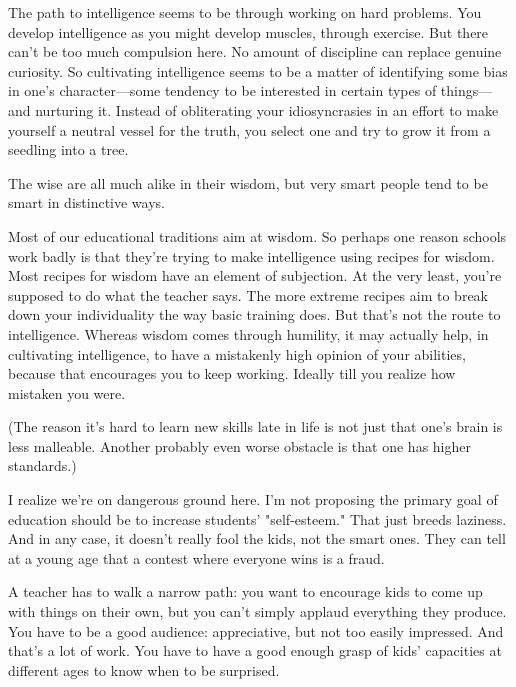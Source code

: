 The path to intelligence seems to
                  be through working on hard problems. You develop intelligence
                  as you might develop muscles, through exercise. But there
                  can't be too much compulsion here. No amount of discipline can
                  replace genuine curiosity. So cultivating intelligence seems
                  to be a matter of identifying some bias in one's
                  character---some tendency to be interested in certain
                  types of things---and nurturing it. Instead of
                  obliterating your idiosyncrasies in an effort to make yourself
                  a neutral vessel for the truth, you select one and try to grow
                  it from a seedling into a tree.

The wise are all
                  much alike in their wisdom, but very smart people tend to be
                  smart in distinctive ways.

Most of our educational
                  traditions aim at wisdom. So perhaps one reason schools work
                  badly is that they're trying to make intelligence using
                  recipes for wisdom. Most recipes for wisdom have an element of
                  subjection. At the very least, you're supposed to do what the
                  teacher says. The more extreme recipes aim to break down your
                  individuality the way basic training does. But that's not the
                  route to intelligence. Whereas wisdom comes through humility,
                  it may actually help, in cultivating intelligence, to have a
                  mistakenly high opinion of your abilities, because that
                  encourages you to keep working. Ideally till you realize how
                  mistaken you were.

(The reason it's hard to learn
                  new skills late in life is not just that one's brain is less
                  malleable. Another probably even worse obstacle is that one
                  has higher standards.)

I realize we're on dangerous
                  ground here. I'm not proposing the primary goal of education
                  should be to increase students' "self-esteem." That just
                  breeds laziness. And in any case, it doesn't really fool the
                  kids, not the smart ones. They can tell at a young age that a
                  contest where everyone wins is a fraud.

A teacher
                  has to walk a narrow path: you want to encourage kids to come
                  up with things on their own, but you can't simply applaud
                  everything they produce. You have to be a good audience:
                  appreciative, but not too easily impressed. And that's a lot
                  of work. You have to have a good enough grasp of kids'
                  capacities at different ages to know when to be surprised.

